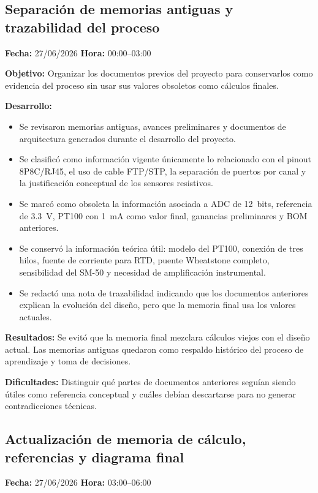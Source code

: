 \documentclass[12pt]{article}
\begin{document}
\subsection{Separación de memorias antiguas y trazabilidad del proceso}
\textbf{Fecha:} 27/06/2026 \quad \textbf{Hora:} 00:00--03:00

\textbf{Objetivo:}
Organizar los documentos previos del proyecto para conservarlos como evidencia del proceso sin usar sus valores obsoletos como cálculos finales.

\textbf{Desarrollo:}
\begin{itemize}
\item Se revisaron memorias antiguas, avances preliminares y documentos de arquitectura generados durante el desarrollo del proyecto.
\item Se clasificó como información vigente únicamente lo relacionado con el pinout 8P8C/RJ45, el uso de cable FTP/STP, la separación de puertos por canal y la justificación conceptual de los sensores resistivos.
\item Se marcó como obsoleta la información asociada a ADC de \SI{12}{bits}, referencia de \SI{3.3}{V}, PT100 con \SI{1}{mA} como valor final, ganancias preliminares y BOM anteriores.
\item Se conservó la información teórica útil: modelo del PT100, conexión de tres hilos, fuente de corriente para RTD, puente Wheatstone completo, sensibilidad del SM-50 y necesidad de amplificación instrumental.
\item Se redactó una nota de trazabilidad indicando que los documentos anteriores explican la evolución del diseño, pero que la memoria final usa los valores actuales.
\end{itemize}

\textbf{Resultados:}
Se evitó que la memoria final mezclara cálculos viejos con el diseño actual. Las memorias antiguas quedaron como respaldo histórico del proceso de aprendizaje y toma de decisiones.

\textbf{Dificultades:}
Distinguir qué partes de documentos anteriores seguían siendo útiles como referencia conceptual y cuáles debían descartarse para no generar contradicciones técnicas.

\subsection{Actualización de memoria de cálculo, referencias y diagrama final}
\textbf{Fecha:} 27/06/2026 \quad \textbf{Hora:} 03:00--06:00
\end{document}
